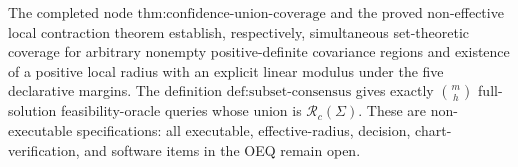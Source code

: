 The completed node \(\text{thm:confidence-union-coverage}\) and the proved non-effective local contraction theorem establish, respectively, simultaneous set-theoretic coverage for arbitrary nonempty positive-definite covariance regions and existence of a positive local radius with an explicit linear modulus under the five declarative margins. The definition \(\text{def:subset-consensus}\) gives exactly \(\binom{m}{h}\) full-solution feasibility-oracle queries whose union is \(\mathcal R_c(\Sigma)\). These are non-executable specifications: all executable, effective-radius, decision, chart-verification, and software items in the OEQ remain open.